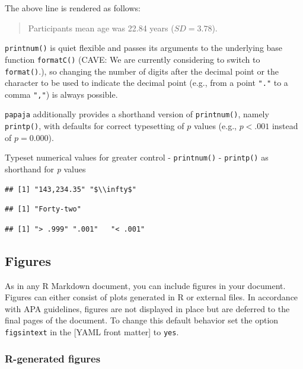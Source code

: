 \documentclass[man,floatsintext]{apa6}
\theoremstyle{definition}
\theoremstyle{definition}
\theoremstyle{definition}
\theoremstyle{remark}
\begin{document}
The above line is rendered as follows:

\begin{quote}
Participants mean age was 22.84 years (\(SD = 3.78\)).
\end{quote}

\texttt{printnum()} is quiet flexible and passes its arguments to the
underlying base function \texttt{formatC()} (CAVE: We are currently
considering to switch to \texttt{format()}.), so changing the number of
digits after the decimal point or the character to be used to indicate
the decimal point (e.g., from a point \texttt{"."} to a comma
\texttt{","}) is always possible.

\texttt{papaja} additionally provides a shorthand version of
\texttt{printnum()}, namely \texttt{printp()}, with defaults for correct
typesetting of \(p\) values (e.g., \(p < .001\) instead of
\(p = 0.000\)).

Typeset numerical values for greater control - \texttt{printnum()} -
\texttt{printp()} as shorthand for \emph{p} values

\begin{verbatim}
## [1] "143,234.35" "$\\infty$"
\end{verbatim}

\begin{verbatim}
## [1] "Forty-two"
\end{verbatim}

\begin{verbatim}
## [1] "> .999" ".001"   "< .001"
\end{verbatim}

\subsection{Figures}\label{figures}

As in any R Markdown document, you can include figures in your document.
Figures can either consist of plots generated in R or external files. In
accordance with APA guidelines, figures are not displayed in place but
are deferred to the final pages of the document. To change this default
behavior set the option \texttt{figsintext} in the {[}YAML front
matter{]} to \texttt{yes}.

\subsubsection{R-generated figures}\label{r-generated-figures}
\end{document}
